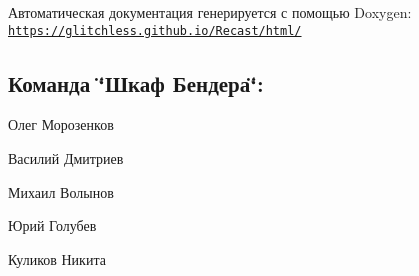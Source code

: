 Автоматическая документация генерируется с помощью Doxygen\-: \href{https://glitchless.github.io/Recast/html/}{\tt https\-://glitchless.\-github.\-io/\-Recast/html/}

\subsection*{Команда \char`\"{}Шкаф Бендера\char`\"{}\-:}


\begin{DoxyItemize}
\item Олег Морозенков
\item Василий Дмитриев
\item Михаил Волынов
\item Юрий Голубев
\item Куликов Никита 
\end{DoxyItemize}